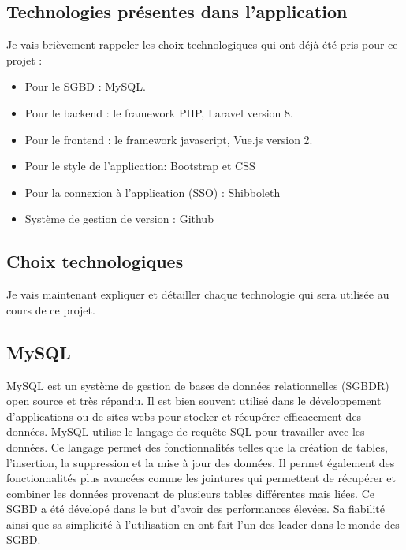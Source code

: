 \subsection{Technologies présentes dans l'application}
Je vais brièvement rappeler les choix technologiques qui ont déjà été pris pour ce projet :
\begin{itemize}
    \item Pour le SGBD : MySQL.
    \item Pour le backend : le framework PHP, Laravel version 8.
    \item Pour le frontend : le framework javascript, Vue.js version 2.
    \item Pour le style de l'application: Bootstrap et CSS
    \item Pour la connexion à l'application (SSO) : Shibboleth
    \item Système de gestion de version : Github
\end{itemize}

\subsection{Choix technologiques}
Je vais maintenant expliquer et détailler chaque technologie qui sera utilisée au cours de ce projet.

\subsection{MySQL}
MySQL est un système de gestion de bases de données relationnelles (SGBDR) open source et très répandu. Il est bien souvent utilisé dans le développement d'applications ou de sites webs pour stocker et récupérer efficacement des données. MySQL utilise le langage de requête SQL pour travailler avec les données. Ce langage permet des fonctionnalités telles que la création de tables, l'insertion, la suppression et la mise à jour des données. Il permet également des fonctionnalités plus avancées comme les jointures qui permettent de récupérer et combiner les données provenant de plusieurs tables différentes mais liées. Ce SGBD a été dévelopé dans le but d'avoir des performances élevées. Sa fiabilité ainsi que sa simplicité à l'utilisation en ont fait l'un des leader dans le monde des SGBD.

